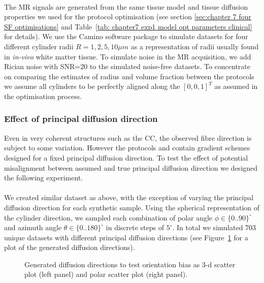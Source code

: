 \paragraph{}
\label{sec: chapter 6 fibre distribution perfect}
The MR signals are generated from the same tissue model and tissue diffusion properties we used for the protocol optimisation (see section \ref{sec:chapter 7 four SF optimisations} and Table~\ref{tab: chapter7 exp1 model opt parameters clinical} for details). We use the Camino software package \citep{Cook:2006} to simulate datasets for four different cylinder radii $R={1,2,5,10}\mu m$ as a representation of radii usually found in \emph{in-vivo} white matter tissue. To simulate noise in the MR acquisition, we add Rician noise with SNR=20 to the simulated noise-free datasets. To concentrate on comparing the estimates of radius and volume fraction between the protocols we assume all cylinders to be perfectly aligned along the $[0,0,1]^T$ as assumed in the optimisation process.

\subsubsection{Effect of principal diffusion direction}
Even in very coherent structures such as the \gls{CC}, the observed fibre direction is subject to some variation. However the protocols {\FD} and {\DO} contain gradient schemes designed for a fixed principal diffusion direction. To test the effect of potential misalignment between assumed and true principal diffusion direction we designed the following experiment.
\paragraph{}
We created similar dataset as above, with the exception of varying the principal diffusion direction for each synthetic sample. Using the spherical representation of the cylinder direction, we sampled each combination of polar angle $\phi \in \{0..90\}^\circ$ and azimuth angle $\theta \in \{0..180\}^\circ$ in discrete steps of $5^\circ$. In total we simulated 703 unique datasets with different principal diffusion directions (see Figure~\ref{fig:chapter7 exp1 Ang Error dirs} for a plot of the generated diffusion directions).
\bgroup
\tikzset{use png}

\begin{figure}[h]
    \centering
	  \ifdraft
	  {
	  	\draftpic
	  }
	  {
	  	
	  }
	
        \caption{Generated diffusion directions to test orientation bias as 3-d scatter plot (left panel) and polar scatter plot (right panel).}
    \label{fig:chapter7 exp1 Ang Error dirs}
\end{figure}
\egroup

